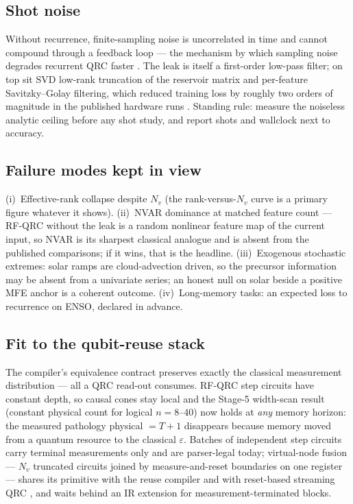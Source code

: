 \subsection{Shot noise}
Without recurrence, finite-sampling noise is uncorrelated in time and cannot
compound through a feedback loop --- the mechanism by which sampling noise
degrades recurrent QRC faster \citep{ahmed2025optimal,hu2024overcoming}. The
leak is itself a first-order low-pass filter; on top sit SVD low-rank
truncation of the reservoir matrix and per-feature Savitzky--Golay
filtering, which reduced training loss by roughly two orders of magnitude in
the published hardware runs \citep{ahmed2025optimal}. Standing rule: measure
the noiseless analytic ceiling before any shot study, and report shots and
wallclock next to accuracy.

\subsection{Failure modes kept in view}
(i)~Effective-rank collapse despite $N_v$ (the rank-versus-$N_v$ curve is a
primary figure whatever it shows). (ii)~NVAR dominance at matched feature
count --- RF-QRC without the leak is a random nonlinear feature map of the
current input, so NVAR is its sharpest classical analogue and is absent from
the published comparisons; if it wins, that is the headline.
(iii)~Exogenous stochastic extremes: solar ramps are cloud-advection driven,
so the precursor information may be absent from a univariate series; an
honest null on solar beside a positive MFE anchor is a coherent outcome.
(iv)~Long-memory tasks: an expected loss to recurrence on ENSO, declared in
advance.

\subsection{Fit to the qubit-reuse stack}
\label{sec:rfqrc-reuse-fit}
The compiler's equivalence contract preserves exactly the classical
measurement distribution --- all a QRC read-out consumes. RF-QRC step
circuits have constant depth, so causal cones stay local and the Stage-5
width-scan result (constant physical count for logical $n=8$--$40$) now
holds at \emph{any} memory horizon: the measured pathology physical
$=T{+}1$ disappears because memory moved from a quantum resource to the
classical $\varepsilon$. Batches of independent step circuits carry terminal
measurements only and are parser-legal today; virtual-node fusion ---
$N_v$ truncated circuits joined by measure-and-reset boundaries on one
register --- shares its primitive with the reuse compiler and with
reset-based streaming QRC \citep{hu2024overcoming}, and waits behind an IR
extension for measurement-terminated blocks.

